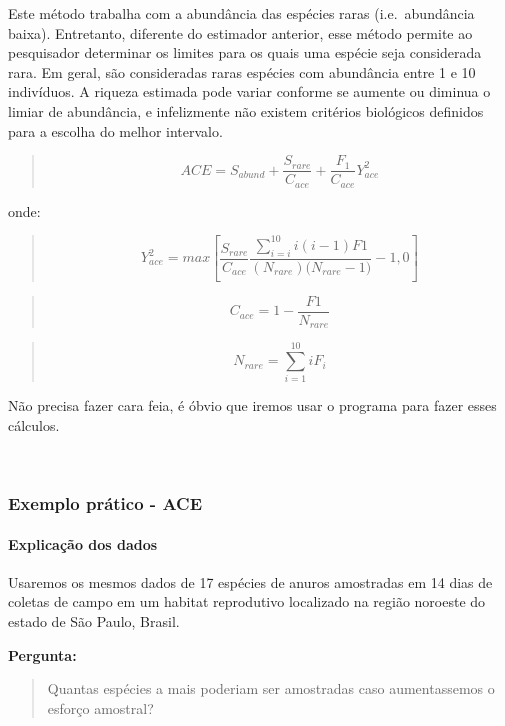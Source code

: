 \documentclass[
]{book}
\begin{document}
Este método trabalha com a abundância das espécies raras (i.e.~abundância baixa). Entretanto, diferente do estimador anterior, esse método permite ao pesquisador determinar os limites para os quais uma espécie seja considerada rara. Em geral, são consideradas raras espécies com abundância entre 1 e 10 indivíduos. A riqueza estimada pode variar conforme se aumente ou diminua o limiar de abundância, e infelizmente não existem critérios biológicos definidos para a escolha do melhor intervalo.

\begin{quote}
\[ACE = S_{abund} + \frac{S_{rare}}{C_{ace}} + \frac{F_1}{C_{ace}}Y_{ace}^2\]
\end{quote}

onde:

\begin{quote}
\[Y_{ace}^2 = max \left[\frac{S_{rare}}{C_{ace}}\frac{\sum_{i=i}^{10}i(i-1)F1}{(N_{rare})({N_{rare} - 1)}}-1,0\right]\]
\end{quote}

\begin{quote}
\[C_{ace} = 1 - \frac{F1}{N_{rare}}\]
\end{quote}

\begin{quote}
\[N_{rare} = \sum_{i=1}^{10}iF_i\]
\end{quote}

Não precisa fazer cara feia, é óbvio que iremos usar o programa para fazer esses cálculos.

~

\hypertarget{exemplo-pruxe1tico---ace}{%
\subsubsection{Exemplo prático - ACE}\label{exemplo-pruxe1tico---ace}}

\hypertarget{explicauxe7uxe3o-dos-dados-1}{%
\paragraph{Explicação dos dados}\label{explicauxe7uxe3o-dos-dados-1}}

Usaremos os mesmos dados de 17 espécies de anuros amostradas em 14 dias de coletas de campo em um habitat reprodutivo localizado na região noroeste do estado de São Paulo, Brasil.

\textbf{Pergunta:}

\begin{quote}
Quantas espécies a mais poderiam ser amostradas caso aumentassemos o esforço amostral?
\end{quote}
\end{document}
